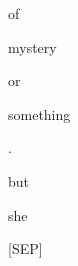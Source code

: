 \documentclass[varwidth=150mm]{standalone}
\begin{document}
\begin{CJK*}{UTF8}{gbsn}
{{{\colorbox{red!2.0175600051879883}{\strut of} \colorbox{red!1.9344251155853271}{\strut mystery} \colorbox{red!0.0}{\strut or} \colorbox{red!1.9203941822052002}{\strut something} \colorbox{red!0.0}{\strut .} \colorbox{red!4.875030994415283}{\strut but} \colorbox{red!1.5292057991027832}{\strut she} \colorbox{red!12.627971649169922}{\strut [SEP]}
}}}
\end{CJK*}
\end{document}
